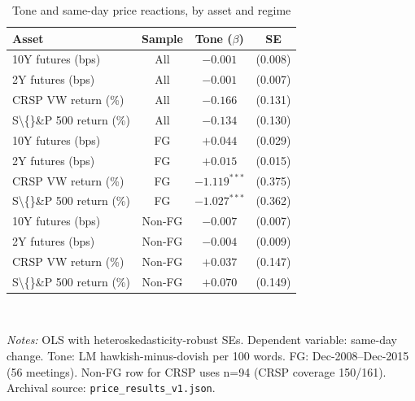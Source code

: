 \begin{table}[!tbp]
\centering\small
\caption{Tone and same-day price reactions, by asset and regime}
\label{tab:41}
\begin{tabular}{lccc}
\toprule
Asset & Sample & Tone ($\beta$) & SE \\
\midrule
10Y futures (bps) & All & $-0.001$ & (0.008) \\
2Y futures (bps) & All & $-0.001$ & (0.007) \\
CRSP VW return (\%) & All & $-0.166$ & (0.131) \\
S\textbackslash\{\}\&P 500 return (\%) & All & $-0.134$ & (0.130) \\
10Y futures (bps) & FG & $+0.044$ & (0.029) \\
2Y futures (bps) & FG & $+0.015$ & (0.015) \\
CRSP VW return (\%) & FG & $-1.119^{***}$ & (0.375) \\
S\textbackslash\{\}\&P 500 return (\%) & FG & $-1.027^{***}$ & (0.362) \\
10Y futures (bps) & Non-FG & $-0.007$ & (0.007) \\
2Y futures (bps) & Non-FG & $-0.004$ & (0.009) \\
CRSP VW return (\%) & Non-FG & $+0.037$ & (0.147) \\
S\textbackslash\{\}\&P 500 return (\%) & Non-FG & $+0.070$ & (0.149) \\
\bottomrule
\end{tabular}
\\[2pt]\begin{minipage}{0.92\linewidth}\footnotesize\emph{Notes:} OLS with heteroskedasticity-robust SEs. Dependent variable: same-day change. Tone: LM hawkish-minus-dovish per 100 words. FG: Dec-2008--Dec-2015 (56 meetings). Non-FG row for CRSP uses n=94 (CRSP coverage 150/161). Archival source: \texttt{price\_results\_v1.json}.\end{minipage}
\end{table}
